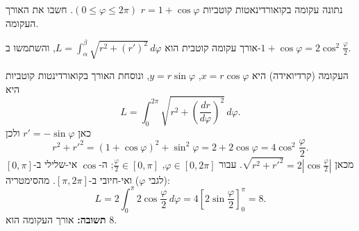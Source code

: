 
\begin{question}
נתונה עקומה בקואורדינאטות קוטביות $r=1+\cos\varphi$ $(0\le\varphi\le2\pi)$. חשבו את האורך העקומה.
\end{question}

\begin{hint}
אורך עקומה קוטבית הוא $L=\int_\alpha^\beta\sqrt{r^2+(r')^2}\,d\varphi$, והשתמשו ב-$1+\cos\varphi=2\cos^2\frac\varphi2$.
\end{hint}

\begin{solution}
העקומה (קרדיואידה) היא $x=r\cos\varphi$, $y=r\sin\varphi$, ונוסחת האורך בקואורדינטות קוטביות היא
\[ L=\int_0^{2\pi}\sqrt{r^2+\left(\frac{dr}{d\varphi}\right)^2}\,d\varphi. \]
כאן $r'=-\sin\varphi$ ולכן
\[ r^2+r'^2=(1+\cos\varphi)^2+\sin^2\varphi=2+2\cos\varphi=4\cos^2\frac\varphi2. \]
מכאן $\sqrt{r^2+r'^2}=2\left|\cos\frac\varphi2\right|$. עבור $\varphi\in[0,2\pi]$, $\frac\varphi2\in[0,\pi]$; ה-$\cos$ אי-שלילי ב-$[0,\pi]$ (לגבי $\varphi$) ואי-חיובי ב-$[\pi,2\pi]$. מהסימטריה:
\[ L=2\int_0^{\pi}2\cos\frac\varphi2\,d\varphi=4\left[2\sin\frac\varphi2\right]_0^\pi=8. \]
\textbf{תשובה:} אורך העקומה הוא $8$.
\end{solution}
